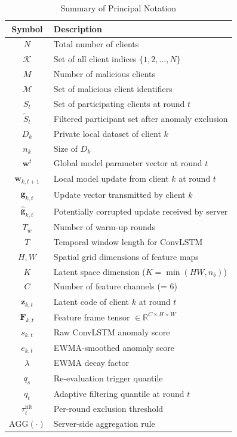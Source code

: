 \documentclass[journal]{IEEEtran}
\begin{document}
\begin{table}[t]
\centering
\caption{Summary of Principal Notation}
\label{tab:notation}
\begin{tabular}{@{}cl@{}}
\toprule
\textbf{Symbol} & \textbf{Description} \\
\midrule
$N$ & Total number of clients \\
$\mathcal{K}$ & Set of all client indices $\{1, 2, \ldots, N\}$ \\
$M$ & Number of malicious clients \\
$\mathcal{M}$ & Set of malicious client identifiers \\
$S_t$ & Set of participating clients at round $t$ \\
$\tilde{S}_t$ & Filtered participant set after anomaly exclusion \\
$D_k$ & Private local dataset of client $k$ \\
$n_k$ & Size of $D_k$ \\
$\mathbf{w}^t$ & Global model parameter vector at round $t$ \\
$\mathbf{w}_{k,t+1}$ & Local model update from client $k$ at round $t$ \\
$\mathbf{g}_{k,t}$ & Update vector transmitted by client $k$ \\
$\hat{\mathbf{g}}_{k,t}$ & Potentially corrupted update received by server \\
$T_w$ & Number of warm-up rounds \\
$T$ & Temporal window length for ConvLSTM \\
$H, W$ & Spatial grid dimensions of feature maps \\
$K$ & Latent space dimension ($K = \min(HW, n_b)$) \\
$C$ & Number of feature channels (= 6) \\
$\mathbf{z}_{k,t}$ & Latent code of client $k$ at round $t$ \\
$\mathbf{F}_{k,t}$ & Feature frame tensor $\in \mathbb{R}^{C \times H \times W}$ \\
$s_{k,t}$ & Raw ConvLSTM anomaly score \\
$e_{k,t}$ & EWMA-smoothed anomaly score \\
$\lambda$ & EWMA decay factor \\
$q_s$ & Re-evaluation trigger quantile \\
$q_t$ & Adaptive filtering quantile at round $t$ \\
$\tau_t^{\text{filt}}$ & Per-round exclusion threshold \\
$\text{AGG}(\cdot)$ & Server-side aggregation rule \\
\bottomrule
\end{tabular}
\end{table}
\end{document}
